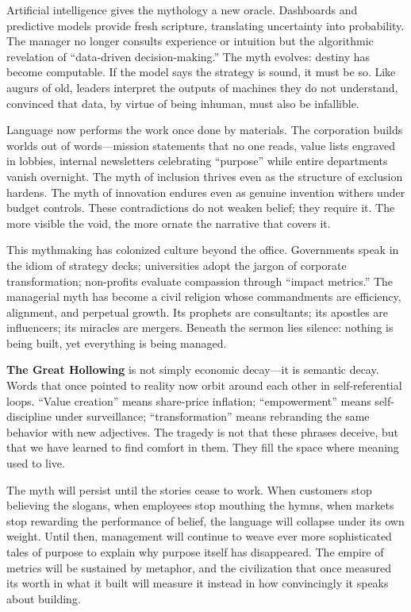 \documentclass[11pt,twoside]{book}
\begin{document}
Artificial intelligence gives the mythology a new oracle.  Dashboards and predictive models provide fresh scripture, translating uncertainty into probability.  The manager no longer consults experience or intuition but the algorithmic revelation of “data-driven decision-making.”  The myth evolves: destiny has become computable.  If the model says the strategy is sound, it must be so.  Like augurs of old, leaders interpret the outputs of machines they do not understand, convinced that data, by virtue of being inhuman, must also be infallible.

Language now performs the work once done by materials.  The corporation builds worlds out of words—mission statements that no one reads, value lists engraved in lobbies, internal newsletters celebrating “purpose” while entire departments vanish overnight.  The myth of inclusion thrives even as the structure of exclusion hardens.  The myth of innovation endures even as genuine invention withers under budget controls.  These contradictions do not weaken belief; they require it.  The more visible the void, the more ornate the narrative that covers it.

This mythmaking has colonized culture beyond the office.  Governments speak in the idiom of strategy decks; universities adopt the jargon of corporate transformation; non-profits evaluate compassion through “impact metrics.”  The managerial myth has become a civil religion whose commandments are efficiency, alignment, and perpetual growth.  Its prophets are consultants; its apostles are influencers; its miracles are mergers.  Beneath the sermon lies silence: nothing is being built, yet everything is being managed.

\textbf{The Great Hollowing} is not simply economic decay—it is semantic decay.  Words that once pointed to reality now orbit around each other in self-referential loops.  “Value creation” means share-price inflation; “empowerment” means self-discipline under surveillance; “transformation” means rebranding the same behavior with new adjectives.  The tragedy is not that these phrases deceive, but that we have learned to find comfort in them.  They fill the space where meaning used to live.

The myth will persist until the stories cease to work.  When customers stop believing the slogans, when employees stop mouthing the hymns, when markets stop rewarding the performance of belief, the language will collapse under its own weight.  Until then, management will continue to weave ever more sophisticated tales of purpose to explain why purpose itself has disappeared.  The empire of metrics will be sustained by metaphor, and the civilization that once measured its worth in what it built will measure it instead in how convincingly it speaks about building.
\end{document}
